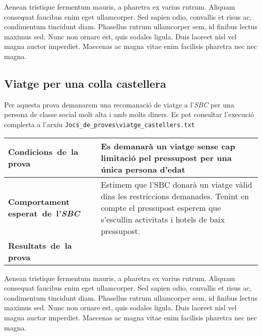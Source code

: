 \documentclass[11pt,a4paper]{article}
\begin{document}
Aenean tristique fermentum mauris, a pharetra ex varius rutrum. Aliquam consequat faucibus enim eget ullamcorper. Sed sapien odio, convallis et risus ac, condimentum tincidunt diam. Phasellus rutrum ullamcorper sem, id finibus lectus maximus sed. Nunc non ornare est, quis sodales ligula. Duis laoreet nisl vel magna auctor imperdiet. Maecenas ac magna vitae enim facilisis pharetra nec nec magna.

\subsection{Viatge per una colla castellera}
Per aquesta prova demanarem una recomanació de viatge a l'\emph{SBC} per una persona de classe social molt alta i amb molts diners. Es pot consultar l'execució complerta a l'arxiu \texttt{Jocs\_de\_proves\textbackslash viatge\_castellers.txt} \\

\noindent
\begin{tabular}{|p{}|p{}|}
\hline
\textbf{\mbox{Condicions de la} \mbox{prova}} & Es demanarà un viatge sense cap limitació pel pressupost per una única persona d'edat\\
\hline
\textbf{Comportament \mbox{esperat de l'\emph{SBC}}} & Estimem que l'SBC donarà un viatge vàlid dins les restriccions demanades. Tenint en compte el pressupost esperem que s'escullin activitats i hotels de baix pressupost. \\
\hline
\textbf{\mbox{Resultats de la} \mbox{prova}} & \\
\hline
\end{tabular}

Aenean tristique fermentum mauris, a pharetra ex varius rutrum. Aliquam consequat faucibus enim eget ullamcorper. Sed sapien odio, convallis et risus ac, condimentum tincidunt diam. Phasellus rutrum ullamcorper sem, id finibus lectus maximus sed. Nunc non ornare est, quis sodales ligula. Duis laoreet nisl vel magna auctor imperdiet. Maecenas ac magna vitae enim facilisis pharetra nec nec magna.
\end{document}
